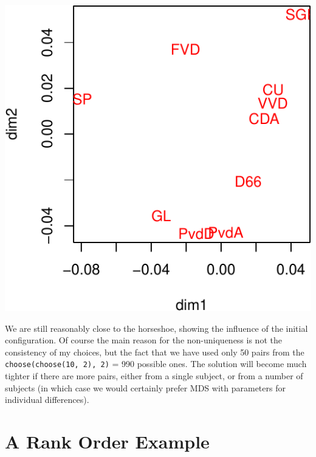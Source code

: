 \documentclass[
  12pt,
]{article}
\begin{document}
\begin{center}\includegraphics{smacofNM_files/figure-latex/partiesxnew-1} \end{center}

We are still reasonably close to the horseshoe, showing the influence of the
initial configuration. Of course the main reason for the non-uniqueness is
not the consistency of my choices, but the fact that we have used only 50
pairs from the \texttt{choose(choose(10,\ 2),\ 2)} = 990 possible
ones. The solution will become much tighter if there are more pairs, either
from a single subject, or from a number of subjects (in which case we would
certainly prefer MDS with parameters for individual differences).

\section{A Rank Order Example}\label{a-rank-order-example}
\end{document}
